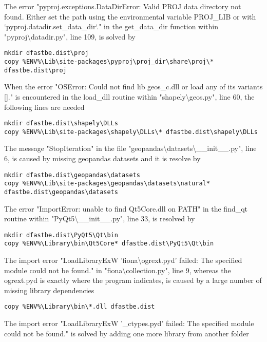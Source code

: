 The error "pyproj.exceptions.DataDirError: Valid PROJ data directory not found. Either set the path using the environmental variable PROJ\_LIB or with `pyproj.datadir.set\_data\_dir`." in the get\_data\_dir function within "pyproj\textbackslash{}datadir.py", line 109, is solved by

\begin{Verbatim}
mkdir dfastbe.dist\proj
copy %ENV%\Lib\site-packages\pyproj\proj_dir\share\proj\* dfastbe.dist\proj
\end{Verbatim}

When the error "OSError: Could not find lib geos\_c.dll or load any of its variants []." is encountered in the load\_dll routine within "shapely\textbackslash{}geos.py", line 60, the following lines are needed

\begin{Verbatim}
mkdir dfastbe.dist\shapely\DLLs
copy %ENV%\Lib\site-packages\shapely\DLLs\* dfastbe.dist\shapely\DLLs
\end{Verbatim}

The message "StopIteration" in the file "geopandas\textbackslash{}datasets\textbackslash{}\_\_init\_\_.py", line 6, is caused by missing geopandas datasets and it is resolve by

\begin{Verbatim}
mkdir dfastbe.dist\geopandas\datasets
copy %ENV%\Lib\site-packages\geopandas\datasets\natural* dfastbe.dist\geopandas\datasets
\end{Verbatim}

The error "ImportError: unable to find Qt5Core.dll on PATH" in the find\_qt routine within "PyQt5\textbackslash{}\_\_init\_\_.py", line 33, is resolved by

\begin{Verbatim}
mkdir dfastbe.dist\PyQt5\Qt\bin
copy %ENV%\Library\bin\Qt5Core* dfastbe.dist\PyQt5\Qt\bin
\end{Verbatim}

The import error "LoadLibraryExW 'fiona\textbackslash{}ogrext.pyd' failed: The specified module could not be found." in "fiona\textbackslash{}collection.py", line 9, whereas the ogrext.pyd is exactly where the program indicates, is caused by a large number of missing library dependencies

\begin{Verbatim}
copy %ENV%\Library\bin\*.dll dfastbe.dist
\end{Verbatim}

The import error "LoadLibraryExW '\_ctypes.pyd' failed: The specified module could not be found." is solved by adding one more library from another folder

